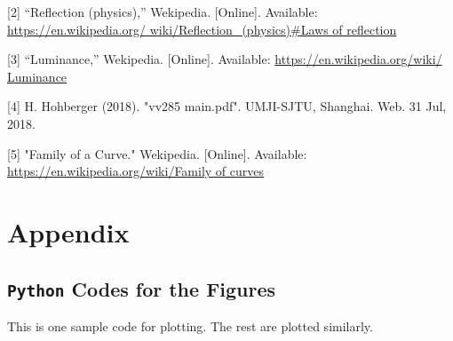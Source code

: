 \documentclass[a4paper]{article}
\begin{document}
[2] “Reflection (physics),” Wekipedia. [Online]. Available: \url{https://en.wikipedia.org/ wiki/Reﬂection_(physics)#Laws of reflection}

[3] “Luminance,” Wekipedia. [Online]. Available: \url{https://en.wikipedia.org/wiki/ Luminance}

[4] H. Hohberger (2018). "vv285 main.pdf". UMJI-SJTU, Shanghai. Web. 31 Jul, 2018.

[5] "Family of a Curve." Wekipedia. [Online]. Available: \url{https://en.wikipedia.org/wiki/Family of curves}
\section{Appendix}
\subsection{\texttt{Python} Codes for the Figures}
This is one sample code for plotting. The rest are plotted similarly.
\lstset{language=C}
\end{document}
